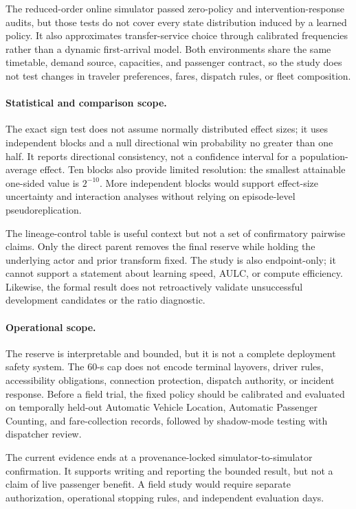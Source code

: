 The reduced-order online simulator passed zero-policy and intervention-response
audits, but those tests do not cover every state distribution induced by a
learned policy. It also approximates transfer-service choice through calibrated
frequencies rather than a dynamic first-arrival model. Both environments share
the same timetable, demand source, capacities, and passenger contract, so the
study does not test changes in traveler preferences, fares, dispatch rules, or
fleet composition.

\paragraph{Statistical and comparison scope.}

The exact sign test does not assume normally distributed effect sizes; it
uses independent blocks and a null directional win probability no greater
than one half. It reports directional
consistency, not a confidence interval for a population-average effect. Ten
blocks also provide limited resolution: the smallest attainable one-sided
value is $2^{-10}$. More independent blocks would support effect-size
uncertainty and interaction analyses without relying on episode-level
pseudoreplication.

The lineage-control table is useful context but not a set of confirmatory
pairwise claims. Only the direct parent removes the final reserve while holding
the underlying actor and prior transform fixed. The study is also endpoint-only;
it cannot support a statement about learning speed, AULC, or compute efficiency.
Likewise, the formal result does not retroactively validate unsuccessful
development candidates or the ratio diagnostic.

\paragraph{Operational scope.}

The reserve is interpretable and bounded, but it is not a complete deployment
safety system. The 60-s cap does not encode terminal layovers, driver rules,
accessibility obligations, connection protection, dispatch authority, or
incident response. Before a field trial, the fixed policy should be calibrated
and evaluated on temporally held-out Automatic Vehicle Location, Automatic
Passenger Counting, and fare-collection records, followed by shadow-mode
testing with dispatcher review.

The current evidence ends at a provenance-locked simulator-to-simulator
confirmation. It supports writing and reporting the bounded result, but not a
claim of live passenger benefit. A field study would require separate
authorization, operational stopping rules, and independent evaluation days.
